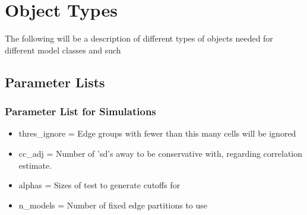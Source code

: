 \documentclass[11pt]{article}
\begin{document}
\section{Object Types}
The following will be a description of different types of objects needed for different model classes and such

\subsection{Parameter Lists}
\subsubsection{Parameter List for Simulations}
\begin{itemize}
\item thres\_ignore = Edge groups with fewer than this many cells will be ignored
\item cc\_adj = Number of 'sd's away to be conservative with, regarding correlation estimate. 
\item alphas = Sizes of test to generate cutoffs for
\item n\_models = Number of fixed edge partitions to use

\end{itemize}
\end{document}
